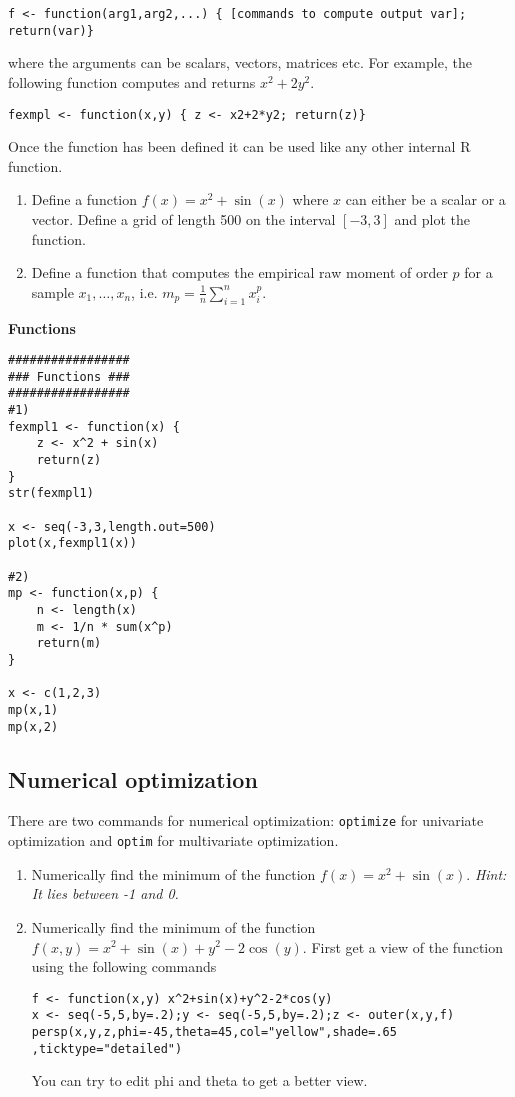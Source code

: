 \documentclass{article}
\begin{document}
\texttt{f <- function(arg1,arg2,...) \{ [commands to compute output var]; return(var)\} }

where the arguments can be scalars, vectors, matrices etc. For example, the following function computes and returns $x^{2}+2y^{2}$.

\texttt{fexmpl <- function(x,y) \{ z <- x2+2*y2; return(z)\}}

Once the function has been defined it can be used like any other internal R function.

\begin{enumerate}\setlength{\itemsep}{-1pt}
\item Define a function $f(x)=x^{2}+\sin (x)$ where $x$ can either be a scalar or a vector. Define a grid of length 500 on the interval $[-3,3]$ and plot the function.

\item Define a function that computes the empirical raw moment of order $p$ for a sample $x_{1},\ldots ,x_{n}$, i.e. $m_{p}=\frac{1}{n}\sum_{i=1}^{n}x_{i}^{p}$.
\end{enumerate}

\begin{solution}
\textbf{Functions}

\begin{verbatim}
#################
### Functions ###
#################
#1)
fexmpl1 <- function(x) {
    z <- x^2 + sin(x)
    return(z)
}
str(fexmpl1)

x <- seq(-3,3,length.out=500)
plot(x,fexmpl1(x))

#2)
mp <- function(x,p) {
	n <- length(x)
	m <- 1/n * sum(x^p)
	return(m)
}

x <- c(1,2,3)
mp(x,1)
mp(x,2)
\end{verbatim}
\end{solution}

\subsection{Numerical optimization}

There are two commands for numerical optimization: \texttt{optimize} for univariate optimization and \texttt{optim} for multivariate optimization.

\begin{enumerate}\setlength{\itemsep}{-1pt}
\item Numerically find the minimum of the function $f(x)=x^{2}+\sin (x)$. \emph{Hint: It lies between -1 and 0.}

\item Numerically find the minimum of the function $f(x,y)=x^{2}+\sin (x)+y^{2}-2\cos (y)$. First get a view of the function using the following commands
\begin{verbatim}
f <- function(x,y) x^2+sin(x)+y^2-2*cos(y)
x <- seq(-5,5,by=.2);y <- seq(-5,5,by=.2);z <- outer(x,y,f)
persp(x,y,z,phi=-45,theta=45,col="yellow",shade=.65 ,ticktype="detailed")
\end{verbatim}
You can try to edit phi and theta to get a better view.
\end{enumerate}
\end{document}
